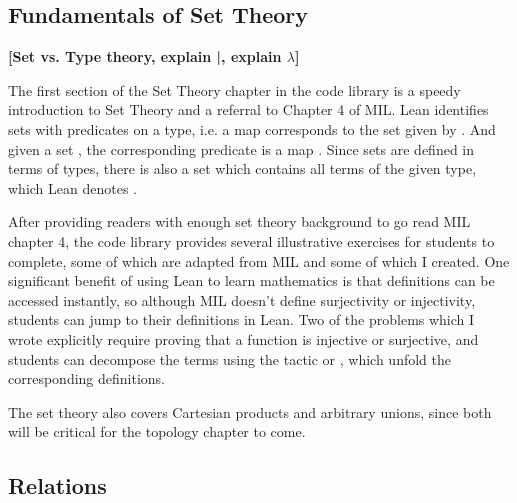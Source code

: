 \subsection{Fundamentals of Set Theory}

\textbf{[Set vs. Type theory, explain |, explain $\lambda$]}

The first section of the Set Theory chapter in the code library is 
a speedy introduction to Set Theory and a referral to Chapter 4 of
MIL. Lean identifies sets with predicates on a type, i.e. a map
 corresponds to the set  given by
. And given a set , the corresponding
predicate is a map . 
Since sets are defined in terms of types, there is also a set which contains 
all terms of the given type, which Lean denotes .

After providing readers with enough set theory background to go read 
MIL chapter 4, the code library provides several illustrative exercises for
students to complete, some of which are adapted from MIL and some of which I 
created. One significant benefit of using Lean to learn mathematics is that
definitions can be accessed instantly, so although MIL doesn't define 
surjectivity or injectivity, students can jump to their definitions in Lean.
Two of the problems which I wrote explicitly require proving that a function is
injective or surjective, and students can decompose the terms using the
tactic  or , which unfold
the corresponding definitions.

The set theory also covers Cartesian products and arbitrary unions, since
both will be critical for the topology chapter to come.

\subsection{Relations}

